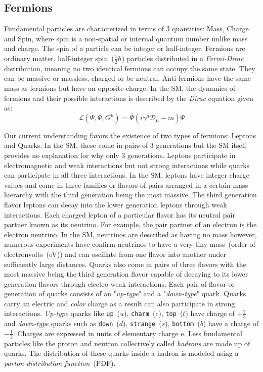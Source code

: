 \subsection*{Fermions}
Fundamental particles are characterized in terms of 3 quantities: Mass, Charge and Spin, where spin is a non-spatial or internal quantum number unlike mass and charge. The spin of a particle can be integer or half-integer.
Fermions are ordinary matter, half-integer spin~($\frac{1}{2} \hbar$) particles distributed in a \textit{Fermi-Dirac} distribution, meaning no two identical fermions can occupy the same state. They can be massive or massless, charged or be neutral. Anti-fermions have the same mass as fermions but have an opposite charge.
\newline
In the SM, the dynamics of fermions and their possible interactions is described by the \textit{Dirac} equation given as:
\begin{equation}
\mathcal{L}(\bar{\Psi},\Psi, G^{\mu}) = \bar{\Psi}\left(i \gamma^{\mu}\mathcal{D}_{\mu} - m \right)\Psi 
\end{equation}

Our current understanding favors the existence of two types of fermions: Leptons and Quarks. In the SM, these come in pairs of 3 generations but the SM itself provides no explanation for why only 3 generations.
Leptons participate in electromagnetic and weak interactions but not strong interactions while quarks can participate in all three interactions. In the SM, leptons have integer charge values and come in three families or flavors of pairs arranged in a certain mass hierarchy with the third generation being the most massive. The third generation flavor leptons can decay into the lower generation leptons through weak interactions. Each charged lepton of a particular flavor has its neutral pair partner known as its neutrino. For example, the pair partner of an electron is the electron neutrino. In the SM, neutrinos are described as having no mass however, numerous experiments have confirm neutrinos to have a very tiny mass~(order of electronvolts~(eV)) and can oscillate from one flavor into another under sufficiently large distances.
\newline
Quarks also come in pairs of three flavors with the most massive being the third generation flavor capable of decaying to its lower generation flavors through electro-weak interactions. Each pair of flavor or generation of quarks consists of an "\textit{up-type}" and a "\textit{down-type}" quark. Quarks carry an electric and \textit{color} charge as a result can also participate in strong interactions. \textit{Up-type} quarks like \texttt{up}~($u$), \texttt{charm}~($c$), \texttt{top}~($t$) have charge of $+\frac{2}{3}$ and \textit{down-type} quarks such as \texttt{down}~($d$), \texttt{strange}~($s$), \texttt{bottom}~($b$) have a charge of $-\frac{1}{3}$. Charges are expressed in units of elementary charge e.
Less fundamental particles like the proton  and neutron collectively called \textit{hadrons} are made up of quarks. The distribution of these quarks inside a hadron is modeled using a \textit{parton distribution function}~(PDF). 

